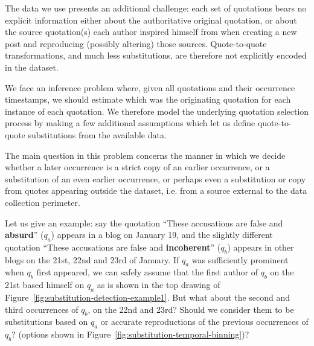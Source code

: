 The data we use presents an additional challenge: each set of quotations bears no explicit information either about the authoritative original quotation, or about the source quotation(s) each author inspired himself from when creating a new post and reproducing (possibly altering) those sources.
Quote-to-quote transformations, and much less substitutions, are therefore not explicitly encoded in the dataset.

We face an inference problem where, given all quotations and their occurrence timestamps, we should estimate which was the originating quotation for each instance of each quotation.
We therefore model the underlying quotation selection process by making a few additional assumptions which let us define quote-to-quote substitutions from the available data.

The main question in this problem concerns the manner in which we decide whether a later occurrence is a strict copy of an earlier occurrence, or a substitution of an even earlier occurrence, or perhaps even a substitution or copy from quotes appearing outside the dataset, \hbox{i.e.} from a source external to the data collection perimeter.

Let us give an example: say the quotation ``These accusations are false and \textbf{absurd}'' ($q_a$) appears in a blog on January 19, and the slightly different quotation ``These accusations are false and \textbf{incoherent}'' ($q_b$) appears in other blogs on the 21st, 22nd and 23rd of January.
If $q_a$ was sufficiently prominent when $q_b$ first appeared, we can safely assume that the first author of $q_b$ on the 21st based himself on $q_a$ as is shown in the top drawing of Figure~\ref{fig:substitution-detection-example1}.
But what about the second and third occurrences of $q_b$, on the 22nd and 23rd?
Should we consider them to be substitutions based on $q_a$ %
or accurate reproductions of the previous occurrences of $q_b$?  (options shown in Figure~\ref{fig:substitution-temporal-binning})?

